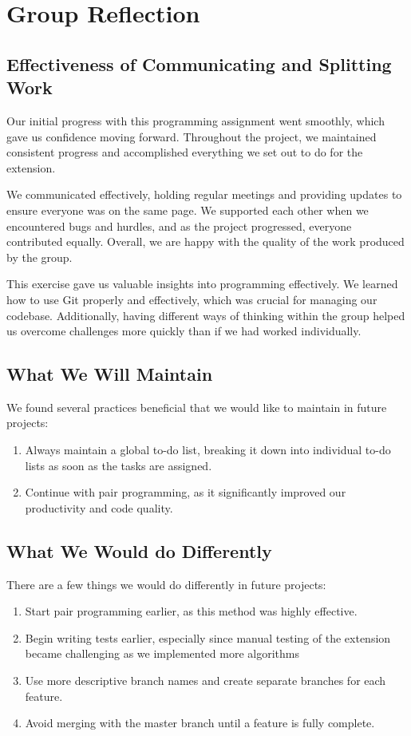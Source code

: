 \documentclass{article}
\begin{document}
\FloatBarrier


\section{Group Reflection}
\subsection{Effectiveness of Communicating and Splitting Work}
Our initial progress with this programming assignment went smoothly, which gave us confidence moving forward. Throughout the project, we maintained consistent progress and accomplished everything we set out to do for the extension.

We communicated effectively, holding regular meetings and providing updates to ensure everyone was on the same page. We supported each other when we encountered bugs and hurdles, and as the project progressed, everyone contributed equally. Overall, we are happy with the quality of the work produced by the group.

This exercise gave us valuable insights into programming effectively. We learned how to use Git properly and effectively, which was crucial for managing our codebase. Additionally, having different ways of thinking within the group helped us overcome challenges more quickly than if we had worked individually.

\subsection{What We Will Maintain}
We found several practices beneficial that we would like to maintain in future projects:

\begin{enumerate}[itemsep=0.5mm]
    \item Always maintain a global to-do list, breaking it down into individual to-do lists as soon as the tasks are assigned.
    \item Continue with pair programming, as it significantly improved our productivity and code quality.
\end{enumerate}

\subsection{What We Would do Differently}
There are a few things we would do differently in future projects:
\begin{enumerate}[itemsep=0.5mm]
    \item Start pair programming earlier, as this method was highly effective.
    \item Begin writing tests earlier, especially since manual testing of the extension became challenging as we implemented more algorithms
    \item Use more descriptive branch names and create separate branches for each feature.
    \item Avoid merging with the master branch until a feature is fully complete.
\end{enumerate}
\end{document}
